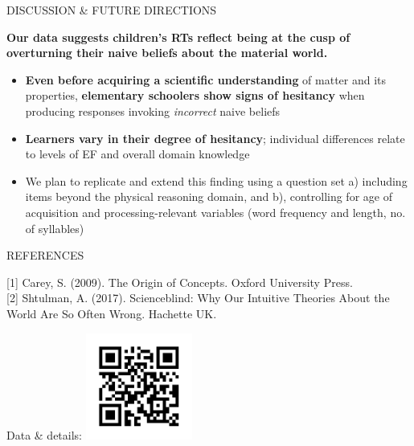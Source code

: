 \documentclass[final]{beamer}
\newlength{\colwidth}
\newlength{\widecolwidth}
\begin{document}
\begin{frame}[t]
\begin{columns}[t]
\begin{column}{\widecolwidth}
\begin{block}{DISCUSSION \& FUTURE DIRECTIONS}
	\begin{tcolorbox}[
		colback=mycolor,
		colframe=mycolor,
		coltext=white,
		boxsep=4pt,
		left=3mm,
		right=3mm,
		top=4mm,
		bottom=4mm,
		arc=5mm,
		auto outer arc,
		boxrule=4pt,
		width=\dimexpr\linewidth-2\fboxsep\relax,
		]
		\centering
		\textbf{\LARGE Our data suggests children's RTs reflect being at the cusp of overturning their naive beliefs about the material world.}
	\end{tcolorbox}
	
    \begin{itemize}
      \item \textbf{Even before acquiring a scientific understanding} of matter and its properties, \textbf{elementary schoolers show signs of hesitancy} when producing responses invoking \emph{incorrect} naive beliefs
      \item \textbf{Learners vary in their degree of hesitancy}; individual differences relate to levels of EF and overall domain knowledge
      \item We plan to replicate and extend this finding using a question set a) including items beyond the physical reasoning domain, and b), controlling for age of acquisition and processing-relevant variables (word frequency and length, no. of syllables)
    \end{itemize}
\end{block}

\begin{block}{\small{REFERENCES}}
\begin{minipage}{0.925\textwidth}
  \footnotesize
  [1] Carey, S. (2009). The Origin of Concepts. Oxford University Press.\\[.5ex]
  [2] Shtulman, A. (2017). Scienceblind: Why Our Intuitive Theories About the World Are So Often Wrong. Hachette UK.
  \end{minipage}%
  \begin{minipage}{0.075\textwidth}
      \centering
      \footnotesize{Data \& details:}
    \href{https://osf.io/bdmuh/}{\includegraphics[height=3.5cm]{images/qrcode.png}}
  \end{minipage}
\end{block}

\end{column}
\end{columns}
\end{frame}
\end{document}
